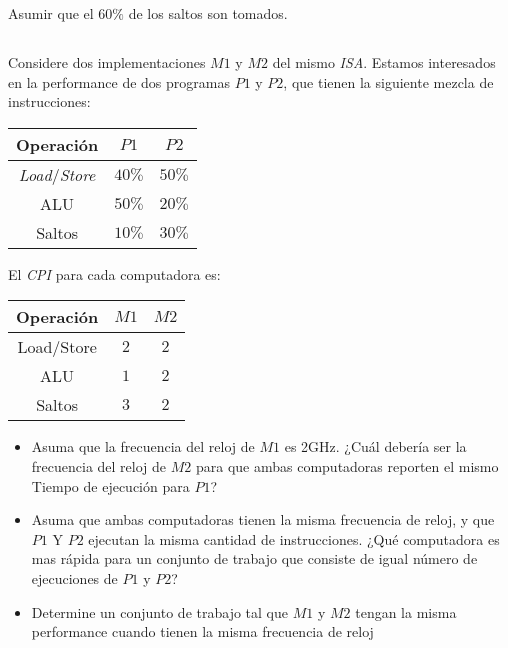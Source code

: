             Asumir que el $60\%$ de los saltos son tomados.

\subsection{}
            Considere dos implementaciones $M1$ y $M2$ del mismo \textit{ISA}. Estamos interesados en la performance de dos programas $P1$ y $P2$, que tienen 
            la siguiente mezcla de instrucciones: 
            
            \begin{center}
            \begin{tabular}{||c|c|c||}
            \hline
            Operación & $P1$ & $P2$ \\\hline
            \textit{Load}/\textit{Store} & $40\%$ & $50\%$ \\\hline
            ALU        & $50\%$ & $20\%$ \\\hline
            Saltos   & $10\%$ & $30\%$ \\\hline
            \end{tabular}
            \end{center}

            El \textit{CPI} para cada computadora es:
            \begin{center}
            \begin{tabular}{||c|c|c||}
            \hline
            Operación & $M1$ & $M2$ \\
            \hline
            Load/Store & $2$ & $2$ \\
            \hline
            ALU        & $1$ & $2$ \\
            \hline
            Saltos   & $3$ & $2$ \\
            \hline
            \end{tabular}
            \end{center}

            \begin{itemize}
            \item Asuma que la frecuencia del reloj de $M1$ es 2GHz. ¿Cuál debería ser la frecuencia del reloj de $M2$ para que ambas
            computadoras reporten el mismo Tiempo de ejecución para $P1$?

            \item Asuma que ambas computadoras tienen la misma frecuencia de reloj, y que  $P1$ Y $P2$ ejecutan la misma cantidad de instrucciones.
            ¿Qué computadora es mas rápida para un conjunto de trabajo que consiste de igual número de ejecuciones de $P1$ y $P2$?

            \item Determine un conjunto de trabajo tal que $M1$ y $M2$ tengan la misma performance cuando tienen la misma frecuencia de reloj

            \end{itemize}
